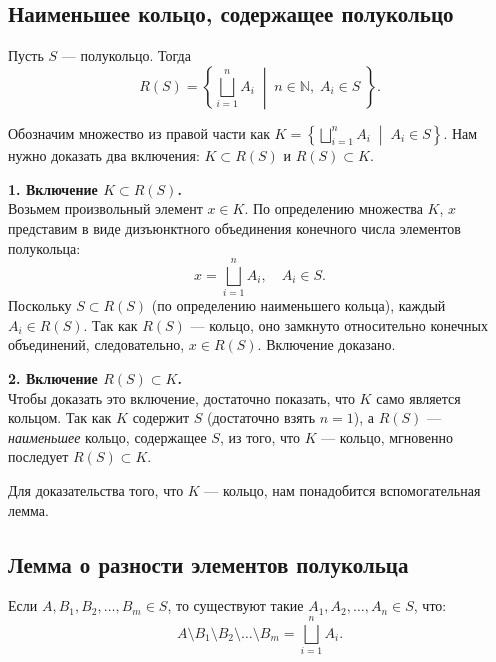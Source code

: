 \subsection{Наименьшее кольцо, содержащее полукольцо}
\begin{theorem}
    Пусть $S$ --- полукольцо. Тогда
    \[
        R(S)
        =
        \left\{
            \bigsqcup_{i=1}^{n} A_i
            \;\middle|\;
            n \in \mathbb{N},\;
            A_i \in S\;
        \right\}.
    \]
\end{theorem}
\begin{Proof}
    Обозначим множество из правой части как $K = \left\{ \bigsqcup_{i=1}^{n} A_i \;\middle|\; A_i \in S \right\}$. 
    Нам нужно доказать два включения: $K \subset R(S)$ и $R(S) \subset K$. %

    \textbf{1. Включение $K \subset R(S)$.} \\
    Возьмем произвольный элемент $x \in K$. По определению множества $K$, $x$ представим в виде дизъюнктного объединения конечного числа элементов полукольца:
    \[
        x = \bigsqcup_{i=1}^{n} A_i, \quad A_i \in S.
    \]
    Поскольку $S \subset R(S)$ (по определению наименьшего кольца), каждый $A_i \in R(S)$. Так как $R(S)$ --- кольцо, оно замкнуто относительно конечных объединений, следовательно, $x \in R(S)$. Включение доказано. %

    \textbf{2. Включение $R(S) \subset K$.} \\
    Чтобы доказать это включение, достаточно показать, что $K$ само является кольцом. Так как $K$ содержит $S$ (достаточно взять $n=1$), а $R(S)$ --- \textit{наименьшее} кольцо, содержащее $S$, из того, что $K$ --- кольцо, мгновенно последует $R(S) \subset K$. %
    
    Для доказательства того, что $K$ --- кольцо, нам понадобится вспомогательная лемма.
\end{Proof}

\subsection{Лемма о разности элементов полукольца}

\begin{lemma}
    Если $A, B_1, B_2, \dots, B_m \in S$, то существуют такие $A_1, A_2, \dots, A_n \in S$, что:
    \[
        A \setminus B_1 \setminus B_2 \setminus \dots \setminus B_m = \bigsqcup_{i=1}^{n} A_i.
    \]
\end{lemma}

